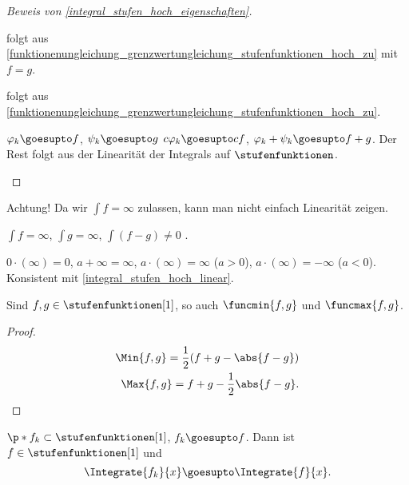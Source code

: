 \begin{proof}[Beweis von \ref{integral_stufen_hoch_eigenschaften}]
  \begin{proofdescription}
    \item[\ref{integral_stufen_hoch_unabhaengig_von_stufenfolge}] folgt aus \ref{funktionenungleichung_grenzwertungleichung_stufenfunktionen_hoch_zu} mit \( f=g \).
    \item[\ref{integral_stufen_hoch_funktionenungleichung_integralungleichung}] folgt aus \ref{funktionenungleichung_grenzwertungleichung_stufenfunktionen_hoch_zu}. 
    \item[\ref{integral_stufen_hoch_linear}] \( \varphi_k\goesupto f \), \( \psi_k\goesupto g \) \timplies \( c\varphi_k\goesupto cf \), \( \varphi_k+\psi_k\goesupto f+g \). Der Rest folgt aus der Linearität der Integrals auf \( \stufenfunktionen \). 
  \end{proofdescription}
\end{proof}
\begin{bemerkung*}
  Achtung! Da wir \( \int f=\infty \) zulassen, kann man nicht einfach Linearität zeigen.
\end{bemerkung*}
\begin{beispiel*}
  \( \int f= \infty \), \( \int g=\infty \), \( \int (f-g)\neq 0 \) \ia.
\end{beispiel*}
\begin{konvention*}
  \( 0\cdot (\infty)=0 \), \( a+\infty=\infty \), \( a\cdot(\infty)=\infty \) (\( a>0 \)), \( a\cdot(\infty)=-\infty \) (\( a<0 \)). Konsistent mit \ref{integral_stufen_hoch_linear}.
\end{konvention*}
\begin{bemerkung*}
  Sind \( f,g\in \stufenfunktionen[1] \), so auch \( \funcmin{f,g} \) und \( \funcmax{f,g} \).
\end{bemerkung*}
\begin{proof}
  \begin{align*}
    \Min{f,g}=\frac{1}{2}(f+g-\abs{f-g})\\
    \Max{f,g}=f+g-\frac{1}{2}\abs{f-g}.
  \end{align*}
  
\end{proof}
\begin{lemma}\label{r1_hoch_zu_funktion_r1_integral_hoch_zu}
  \( \p*{f_k}\subset \stufenfunktionen[1] \), \( f_k\goesupto f \). Dann ist \( f\in \stufenfunktionen[1] \) und 
  \begin{equation*}
    \Integrate{f_k}{x}\goesupto \Integrate{f}{x}.
  \end{equation*}
\end{lemma}
